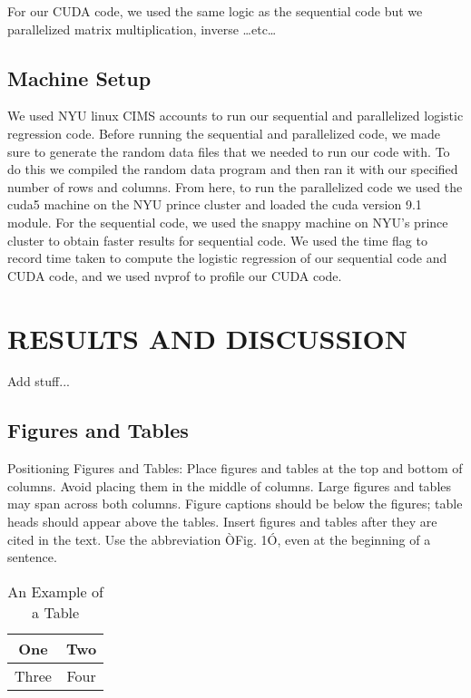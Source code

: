 \documentclass[letterpaper, 10 pt, conference]{ieeeconf}  %
\begin{document}
For our CUDA code, we used the same logic as the sequential code but we parallelized  matrix multiplication, inverse …etc…

\subsection{Machine Setup}

We used NYU linux CIMS accounts to run our sequential and parallelized logistic regression code. Before running the sequential and parallelized code, we made sure to generate the random data files that we needed to run our code with. To do this we compiled the random data program and then ran it with our specified number of rows and columns. From here, to run the parallelized code we used the cuda5 machine on the NYU prince cluster and loaded the cuda version 9.1 module. For the sequential code, we used the snappy machine on NYU’s prince cluster to obtain faster results for sequential code. We used the time flag to record time taken to compute the logistic regression of our sequential code and CUDA code, and we used nvprof to profile our CUDA code. 

\section{RESULTS AND DISCUSSION}
Add stuff...

\subsection{Figures and Tables}

Positioning Figures and Tables: Place figures and tables at the top and bottom of columns. Avoid placing them in the middle of columns. Large figures and tables may span across both columns. Figure captions should be below the figures; table heads should appear above the tables. Insert figures and tables after they are cited in the text. Use the abbreviation ÒFig. 1Ó, even at the beginning of a sentence.

\begin{table}[h]
\caption{An Example of a Table}
\label{table_example}
\begin{center}
\begin{tabular}{|c||c|}
\hline
One & Two\\
\hline
Three & Four\\
\hline
\end{tabular}
\end{center}
\end{table}
\end{document}
